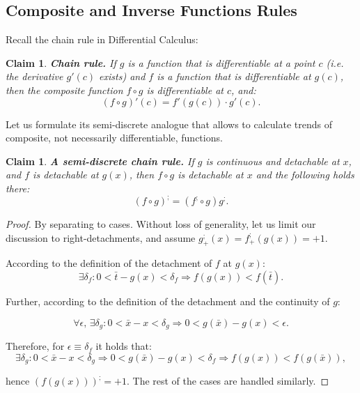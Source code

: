 \documentclass[11pt]{book}
\newtheorem{clm}[thm]{Claim}
\begin{document}
\subsection{Composite and Inverse Functions Rules}

Recall the chain rule in Differential Calculus:
\begin{clm}\textbf{Chain rule. }If $g$ is a function that is differentiable at a point $c$ (i.e. the derivative $g'\left(c\right)$ exists) and $f$ is a function that is differentiable at $g\left(c\right)$, then the composite function $f\circ g$ is differentiable at $c$, and:
$$\left(f\circ g\right)'\left(c\right)=f'\left(g\left(c\right)\right)\cdot g'\left(c\right).$$
\label{chain_rule_derivative}
\end{clm}
Let us formulate its semi-discrete analogue that allows to calculate trends of composite, not necessarily differentiable, functions.
\begin{clm}\textbf{A semi-discrete chain rule.} If $g$ is continuous and detachable at $x$, and $f$ is detachable at $g\left(x\right)$, then $f\circ g $ is detachable at $x$ and the following holds there:
$$\left( f \circ g \right) ^{;}=\left(f^{;}\circ g\right)g^{;}.$$
\label{chain_rule_detachment}
\end{clm}

\begin{proof}By separating to cases. Without loss of generality, let us limit our discussion to right-detachments, and assume $g_{+}^{;}\left(x\right)=f_{+}^{;}\left(g\left(x\right)\right)=+1.$

According to the definition of the detachment of $f$ at $g\left(x\right)$:
$$\exists\delta_{f}:0<\bar{t}-g\left(x\right)<\delta_{f}\Longrightarrow f\left(g\left(x\right)\right)<f\left(\bar{t}\right).$$

Further, according to the definition of the detachment and the continuity of $g$:

$$\forall\epsilon,\,\exists\delta_{g}:0<\bar{x}-x<\delta_{g}\Longrightarrow0<g\left(\bar{x}\right)-g\left(x\right)<\epsilon.$$

Therefore, for $\epsilon\equiv\delta_{f}$ it holds that:
$$\exists\delta_{g}:0<\bar{x}-x<\delta_{g}\Longrightarrow0<g\left(\bar{x}\right)-g\left(x\right)<\delta_{f}\Longrightarrow f\left(g\left(x\right)\right)<f\left(g\left(\bar{x}\right)\right),$$

hence $\left(f\left(g\left(x\right)\right)\right)^{;}=+1.$ The rest of the cases are handled similarly.
\end{proof}
\end{document}
